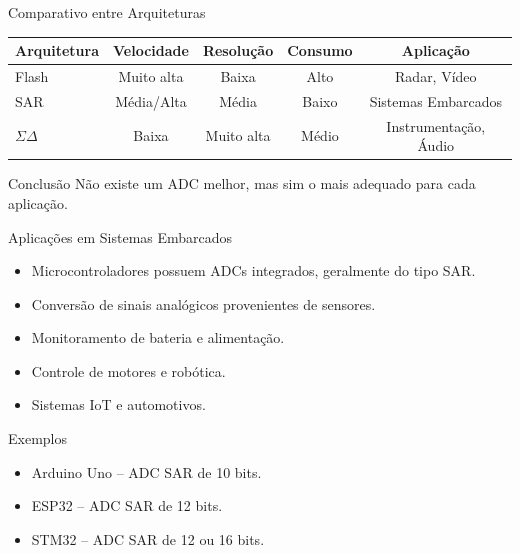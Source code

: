 \documentclass{beamer}
\begin{document}
\begin{frame}{Comparativo entre Arquiteturas}
	
	\begin{table}
		\centering
		\footnotesize
		\begin{tabular}{lcccc}
			\toprule
			\textbf{Arquitetura} & \textbf{Velocidade} & \textbf{Resolução} & \textbf{Consumo} & \textbf{Aplicação} \\
			\midrule
			Flash & Muito alta & Baixa & Alto & Radar, Vídeo \\
			SAR & Média/Alta & Média & Baixo & Sistemas Embarcados \\
			$\Sigma\Delta$ & Baixa & Muito alta & Médio & Instrumentação, Áudio \\
			\bottomrule
		\end{tabular}
	\end{table}
	
	\vspace{0.3cm}
	
	\begin{alertblock}{Conclusão}
		Não existe um ADC melhor, mas sim o mais adequado para cada aplicação.
	\end{alertblock}
	
\end{frame}

\begin{frame}{Aplicações em Sistemas Embarcados}
	
	\begin{itemize}
		\item Microcontroladores possuem ADCs integrados, geralmente do tipo SAR.
		\item Conversão de sinais analógicos provenientes de sensores.
		\item Monitoramento de bateria e alimentação.
		\item Controle de motores e robótica.
		\item Sistemas IoT e automotivos.
	\end{itemize}
	
	\vspace{0.3cm}
	
	\begin{block}{Exemplos}
		\begin{itemize}
			\item Arduino Uno -- ADC SAR de 10 bits.
			\item ESP32 -- ADC SAR de 12 bits.
			\item STM32 -- ADC SAR de 12 ou 16 bits.
		\end{itemize}
	\end{block}
	
\end{frame}
\end{document}

